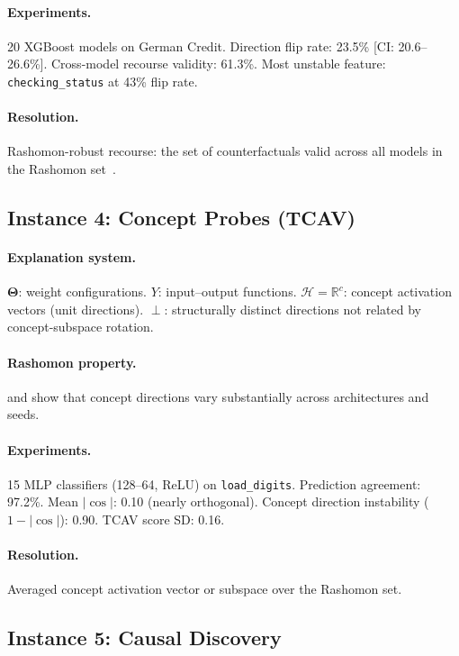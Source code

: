 \documentclass[11pt]{article}
\newcommand{\R}{\mathbb{R}}
\newcommand{\Params}{\mathbf{\Theta}}
\newcommand{\sH}{\mathcal{H}}
\newcommand{\incomp}{\perp}
\begin{document}
\paragraph{Experiments.}
20 XGBoost models on German Credit. Direction flip rate: 23.5\%
[CI: 20.6--26.6\%]. Cross-model recourse validity: 61.3\%.
Most unstable feature: \texttt{checking\_status} at 43\% flip rate.

\paragraph{Resolution.}
Rashomon-robust recourse: the set of counterfactuals valid across all
models in the Rashomon set~\cite{karimi2020algorithmic}.

\subsection{Instance 4: Concept Probes (TCAV)}

\paragraph{Explanation system.}
$\Params$: weight configurations.
$Y$: input--output functions.
$\sH = \R^c$: concept activation vectors (unit directions).
$\incomp$: structurally distinct directions not related by
concept-subspace rotation.

\paragraph{Rashomon property.}
\citet{bolukbasi2016man} and \citet{ravfogel2020null} show that concept
directions vary substantially across architectures and seeds.

\paragraph{Experiments.}
15 MLP classifiers (128--64, ReLU) on \texttt{load\_digits}.
Prediction agreement: 97.2\%. Mean $|\cos|$: 0.10 (nearly orthogonal).
Concept direction instability ($1-|\cos|$): 0.90. TCAV score SD: 0.16.

\paragraph{Resolution.}
Averaged concept activation vector or subspace over the Rashomon set.

\subsection{Instance 5: Causal Discovery}
\end{document}
